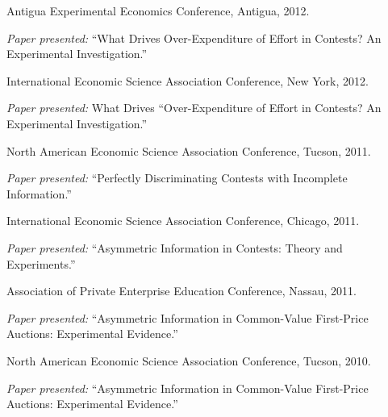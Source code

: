 \documentclass{article}%
\renewenvironment{itemize}{
\begin{list}{}{
\setlength{\leftmargin}{1.5em}
}
}{
\end{list}
}
\begin{document}
\begin{itemize}
\item Antigua Experimental Economics Conference, Antigua, 2012.
\begin{itemize}\vspace{-.24cm}
\item \textit{Paper presented:} ``What Drives Over-Expenditure of Effort in Contests? An Experimental Investigation.''
\end{itemize}

\item International Economic Science Association Conference, New York, 2012.
\begin{itemize}\vspace{-.24cm}
\item \textit{Paper presented:} What Drives ``Over-Expenditure of Effort in Contests? An Experimental Investigation.''
\end{itemize}

\item North American Economic Science Association Conference, Tucson, 2011.
\begin{itemize}\vspace{-.24cm}
\item \textit{Paper presented:} ``Perfectly Discriminating Contests with Incomplete Information.''
\end{itemize}

\item International Economic Science Association Conference, Chicago, 2011.
\begin{itemize}\vspace{-.24cm}
\item \textit{Paper presented:} ``Asymmetric Information in Contests: Theory and Experiments.''
\end{itemize}

\item Association of Private Enterprise Education Conference, Nassau, 2011.
\begin{itemize}\vspace{-.24cm}
\item \textit{Paper presented:} ``Asymmetric Information in
Common-Value First-Price Auctions: Experimental Evidence.''
\end{itemize}

\item North American Economic Science Association Conference, Tucson, 2010.
\begin{itemize}\vspace{-.24cm}
\item \textit{Paper presented:} ``Asymmetric Information in
Common-Value First-Price Auctions: Experimental Evidence.''
\end{itemize}


\end{itemize}
\end{document}
